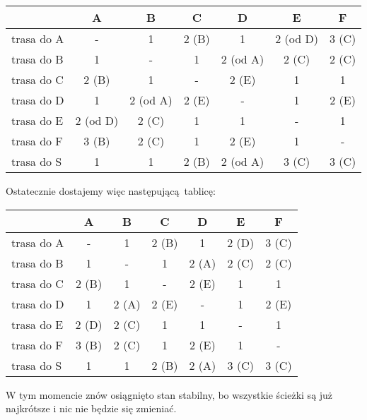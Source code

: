 \documentclass[a4paper, oneside]{article}
\begin{document}
\begin{description}
{        \begin{table}[H]
        \centering
        \begin{tabular}{|l|c|c|c|c|c|c|}
        \hline
        & \textbf{A} & \textbf{B} 
        & \textbf{C} & \textbf{D} 
        & \textbf{E} & \textbf{F} \\ \hline\hline
        trasa do A & -        & 1     & 2 (B) & 1         & \cellcolor{green!10} 2 \cellcolor{green!10}(od D) & 3 (C) \\ \hline
        trasa do B & 1        & -     & 1     & 2 \cellcolor{green!10}(od A)  & 2 (C) & 2 (C) \\ \hline
        trasa do C & 2 (B)    & 1     & -     & 2 (E)     & 1     & 1     \\ \hline
        trasa do D & 1   & 2 \cellcolor{green!10}(od A) & 2 (E) & -           & 1     & 2 (E) \\ \hline
        trasa do E & 2 \cellcolor{green!10}(od D) & 2 (C) & 1     & 1         & -     & 1     \\ \hline
        trasa do F & 3 (B)    & 2 (C) & 1     & 2 (E)     & 1     & -     \\ \hline
        trasa do S & 1        & 1     & 2 (B) & 2 \cellcolor{green!10}(od A)  & 3 (C) & 3 (C) \\ \hline
        \end{tabular}
        \end{table}

        Ostatecznie dostajemy więc następującą tablicę:
        \begin{table}[H]
        \centering
        \begin{tabular}{|l|c|c|c|c|c|c|}
        \hline
        & \textbf{A} & \textbf{B} 
        & \textbf{C} & \textbf{D} 
        & \textbf{E} & \textbf{F} \\ \hline\hline
        trasa do A & -        & 1     & 2 (B) & 1         & 2 (D) & 3 (C) \\ \hline
        trasa do B & 1        & -     & 1     & 2 (A)  & 2 (C) & 2 (C) \\ \hline
        trasa do C & 2 (B)    & 1     & -     & 2 (E)     & 1     & 1     \\ \hline
        trasa do D & 1   & 2 (A) & 2 (E) & -           & 1     & 2 (E) \\ \hline
        trasa do E & 2 (D) & 2 (C) & 1     & 1         & -     & 1     \\ \hline
        trasa do F & 3 (B)    & 2 (C) & 1     & 2 (E)     & 1     & -     \\ \hline
        trasa do S & 1        & 1     & 2 (B) & 2 (A)  & 3 (C) & 3 (C) \\ \hline
        \end{tabular}
        \end{table}

        W tym momencie znów osiągnięto stan stabilny, bo wszystkie ścieżki
        są już najkrótsze i nic nie będzie się zmieniać.
    }
\end{description}
\end{document}
